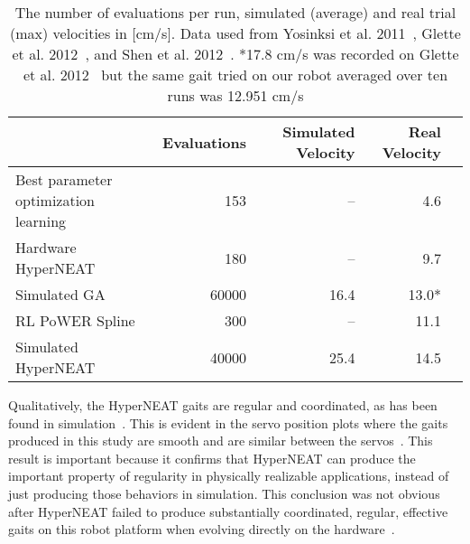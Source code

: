 \begin{table}
\caption{The number of evaluations per run, simulated (average) and real trial (max) velocities in [cm/s]. Data used from Yosinksi et al. 2011~\cite{yos:clune}, Glette et al. 2012~\cite{glette}, and Shen et al. 2012~\cite{haocheng}.
*17.8 cm/s was recorded on Glette et al. 2012~\cite{glette} but the same gait tried on our robot averaged over ten runs was 12.951 cm/s}  %
\begin{center}
\begin{tabular}{|l|r|r|r|r|}
\hline
                                         & Evaluations  & Simulated Velocity  & Real Velocity \\
\hline
Best parameter optimization learning    &153    & --    & 4.6 \\
\hline
Hardware HyperNEAT                  & 180         & --         &   9.7     \\
\hline
Simulated GA              & 60000       & 16.4       &   13.0*     \\
\hline
RL PoWER Spline                          & 300         & --         &   11.1 \\
\hline
Simulated HyperNEAT                      & 40000       & 25.4       &   14.5 \\
\hline
\end{tabular}
\end{center}
\label{resultsTable}
\end{table}


Qualitatively, the HyperNEAT gaits are regular and coordinated, as has been found in simulation~\cite{clune2009evolving, clune2011performance}. This is evident in the servo position plots where the gaits produced in this study are smooth and are similar between the servos~. This result is important because it confirms that HyperNEAT can produce the important property of regularity in physically realizable applications, instead of just producing those behaviors in simulation. This conclusion was not obvious after HyperNEAT failed to produce substantially coordinated, regular, effective gaits on this robot platform when evolving directly on the hardware~\cite{yos:clune}. 

